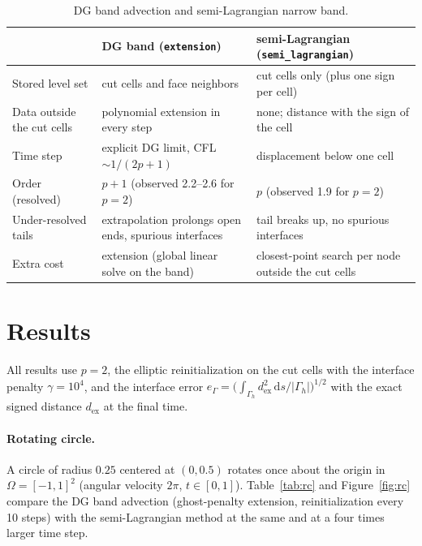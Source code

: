 \documentclass[11pt,a4paper]{article}
\newcommand{\dd}{\,\mathrm{d}}
\begin{document}
\begin{table}[ht]
  \centering
  \small
  \caption{DG band advection and semi-Lagrangian narrow band.}
  \label{tab:compare}
  \begin{tabular}{@{}p{3.3cm}p{5.6cm}p{5.6cm}@{}}
    \toprule
    & DG band (\texttt{extension}) & semi-Lagrangian (\texttt{semi\_lagrangian}) \\
    \midrule
    Stored level set & cut cells and face neighbors & cut cells only (plus one sign per cell) \\
    Data outside the cut cells & polynomial extension in every step & none; distance with the sign of
    the cell \\
    Time step & explicit DG limit, CFL $\sim 1/(2p+1)$ & displacement below one cell \\
    Order (resolved) & $p+1$ (observed 2.2--2.6 for $p=2$) & $p$ (observed 1.9 for $p=2$) \\
    Under-resolved tails & extrapolation prolongs open ends, spurious interfaces & tail breaks up,
    no spurious interfaces \\
    Extra cost & extension (global linear solve on the band) & closest-point search per node
    outside the cut cells \\
    \bottomrule
  \end{tabular}
\end{table}

\FloatBarrier
\section{Results}
\label{sec:results}

All results use $p = 2$, the elliptic reinitialization on the cut cells with the interface penalty
$\gamma = 10^4$, and the interface error
$e_\Gamma = \big(\int_{\Gamma_h} d_{\mathrm{ex}}^2 \dd s / |\Gamma_h|\big)^{1/2}$ with the exact
signed distance $d_{\mathrm{ex}}$ at the final time.

\paragraph{Rotating circle.}
A circle of radius $0.25$ centered at $(0, 0.5)$ rotates once about the origin in
$\Omega = [-1, 1]^2$ (angular velocity $2\pi$, $t \in [0, 1]$). Table~\ref{tab:rc} and
Figure~\ref{fig:rc} compare the DG band advection (ghost-penalty extension, reinitialization every
10 steps) with the semi-Lagrangian method at the same and at a four times larger time step.
\end{document}
